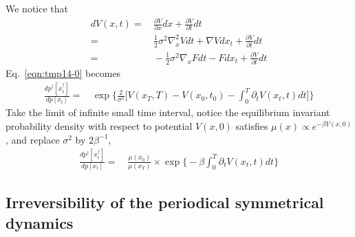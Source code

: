\documentclass[aps, pre, preprint,unsortedaddress,a4paper,onecolumn]{revtex4}
\newcommand{\mymu}{\mu}
\begin{document}
We notice that
\begin{align}\nonumber
  dV(x, t) = &\, \frac{\partial V}{\partial x} dx + \frac{\partial V}{\partial t} dt\\\nonumber
  =&\,
  \frac12 \sigma^2 \nabla^2_x V dt +  \nabla V dx_t + \frac{\partial V}{\partial t} dt \\
  =&\,
  -\frac12 \sigma^2 \nabla_x F dt -  F dx_t + \frac{\partial V}{\partial t} dt
\end{align}
Eq.~\eqref{eqn:tmp14-0} becomes
\begin{align}
  \frac{  dp^\dagger[x^\dagger_t] }{ dp[x_t]}
  =&\,
  \exp\bigg\{
  \frac2{\sigma^2}\bigg[
  V(x_T,T) - V(x_0,t_0) - \int_0^T\partial_tV(x_t,t)dt
  \bigg]
  \bigg\}
\end{align}
Take the limit of infinite small time interval, notice the equilibrium
invariant probability density with respect to potential $V(x,0)$ satisfies $\mymu(x) \propto e^{-\beta V(x,0)}$, and replace $\sigma^2$ by $2\beta^{-1}$,
\begin{align}
  \frac{  dp^\dagger[x^\dagger_t] }{ dp[x_t]}
  =&\,
  \frac{\mymu(x_0)}{\mymu(x_T)}\times
  \exp\bigg\{
  - \beta\int_0^T\partial_tV(x_t,t)dt
  \bigg\}
\end{align}

\subsection{Irreversibility of the periodical symmetrical dynamics}
\end{document}
